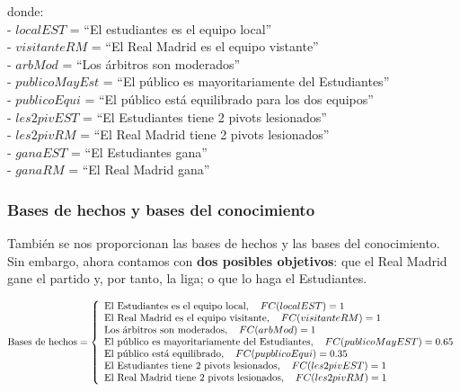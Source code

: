 \documentclass[a4paper,11pt, includehead]{article}
\begin{document}
\noindent donde:\\[1ex]
\indent - $localEST$ = \textquotedblleft El estudiantes es el equipo local\textquotedblright \\
\indent - $visitanteRM$ = \textquotedblleft El Real Madrid es el equipo vistante\textquotedblright \\
\indent - $arbMod$ = \textquotedblleft Los árbitros son moderados\textquotedblright \\
\indent - $publicoMayEst$ = \textquotedblleft El público es mayoritariamente del Estudiantes\textquotedblright \\
\indent - $publicoEqui$ = \textquotedblleft El público está equilibrado para los dos equipos\textquotedblright \\
\indent - $les2pivEST$ = \textquotedblleft El Estudiantes tiene 2 pivots lesionados\textquotedblright \\
\indent - $les2pivRM$ = \textquotedblleft El Real Madrid tiene 2 pivots lesionados\textquotedblright \\
\indent - $ganaEST$ = \textquotedblleft El Estudiantes gana\textquotedblright \\
\indent - $ganaRM$ = \textquotedblleft El Real Madrid gana\textquotedblright \\


\subsubsection{Bases de hechos y bases del conocimiento}
También se nos proporcionan las bases de hechos y las bases del conocimiento. Sin embargo, ahora contamos con \textbf{dos posibles objetivos}: que el Real Madrid gane el partido y, por tanto, la liga; o que lo haga el Estudiantes.

\vspace{6ex}

\noindent$
\text{Bases de hechos} =
\left\{ 
\begin{array}{l}
	\text{El Estudiantes es el equipo local},\quad FC (localEST)=1 \cr
	\text{El Real Madrid es el equipo visitante},\quad FC (visitanteRM)=1 \cr
	\text{Los árbitros son moderados},\quad FC (arbMod)=1 \cr
	\text{El público es mayoritariamente del Estudiantes},\quad FC (publicoMayEST)=0.65 \cr
	\text{El público está equilibrado},\quad FC (pupblicoEqui)=0.35 \cr
	\text{El Estudiantes tiene 2 pivots lesionados},\quad FC (les2pivEST)=1 \cr
	\text{El Real Madrid tiene 2 pivots lesionados},\quad FC (les2pivRM)=1 
\end{array} 
\right.
$
\end{document}
